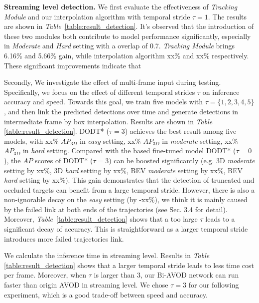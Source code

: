 \documentclass[letterpaper, 10 pt, conference]{ieeeconf}  %
\def\tablename{\emph{Table}}
\begin{document}
\textbf{Streaming level detection.} We first evaluate the effectiveness of \textit{Tracking Module} and our interpolation algorithm with temporal stride $\tau = 1$. The results are shown in \tablename \, \ref{table:result_detection}. It's observed that the introduction of these two modules both contribute to model performance significantly, especially in \textit{Moderate} and \textit{Hard} setting with a overlap of 0.7. \textit{Tracking Module} brings 6.16\% and 5.66\% gain, while interpolation algorithm xx\% and xx\% respectively. These significant improvements indicate that 

Secondly, We investigate the effect of multi-frame input during testing. Specifically, we focus on the effect of different temporal strides $\tau$  on inference accuracy and speed. Towards this goal, we train five models with $\tau = \{1, 2, 3, 4, 5\}$, and then link the predicted detections over time and generate detections in intermediate frame by box interpolation. Results are shown in \tablename \, \ref{table:result_detection}. DODT* ($\tau = 3$) achieves the best result among five models, with xx\% $AP_{3D}$ in \textit{easy} setting, xx\% $AP_{3D}$ in \textit{moderate} setting, xx\% $AP_{3D}$ in \textit{hard} setting. Compared with the based fine-tuned model DODT* ($\tau = 0$), the $AP$ scores of DODT* ($\tau = 3$) can be boosted significantly (e.g. 3D \textit{moderate} setting by xx\%, 3D \textit{hard} setting by xx\%, BEV \textit{moderate} setting by xx\%, BEV \textit{hard} setting by xx\%). This gain demonstrates that the detection of truncated and occluded targets can benefit from a large temporal stride. However, there is also a non-ignorable decay on the \textit{easy} setting (by -xx\%), we think it is mainly caused by the failed link at both ends of the trajectories (see Sec. 3.4 for detail). Moreover,  \tablename \, \ref{table:result_detection} shows that a too large $\tau$ leads to a significant decay of accuracy. This is straightforward as a larger temporal stride introduces more failed trajectories link.

We calculate the inference time in streaming level. Results in  \tablename \, \ref{table:result_detection} shows that a larger temporal stride leads to less time cost per frame. Moreover, when $\tau$ is larger than 3, our Bi-AVOD network can run faster than origin AVOD in streaming level. We chose $\tau = 3$ for our following experiment, which is a good trade-off between speed and accuracy.
\end{document}
